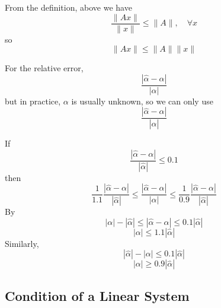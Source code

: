 From the definition, above we have \[
    \frac{\|Ax\|}{\|x\|} \leq \|A\|,\quad \forall x
\]
so \[
    \|Ax\| \leq \|A\| \|x\|
\]

\begin{note}

    For the relative error, \[
        \frac{|\hat{\alpha} - \alpha|}{|\alpha|}
    \]
    but in practice, $\alpha$ is usually unknown, so we can only use \[
        \frac{|\hat{\alpha} - \alpha|}{|\hat{\alpha}|}
    \]
    
    If \[
        \frac{|\hat{\alpha} - \alpha|}{|\hat{\alpha}|} \leq 0.1
    \]
    then \[
        \frac{1}{1.1} \frac{|\hat{\alpha} - \alpha|}{|\hat{\alpha}|} \leq \frac{|\hat{\alpha} - \alpha|}{|\alpha|} \leq \frac{1}{0.9} \frac{|\hat{\alpha} - \alpha|}{|\hat{\alpha}|}
    \]
    By \[
        |\alpha| - |\hat{\alpha}| \leq |\hat{\alpha} - \alpha| \leq 0.1 |\hat{\alpha}|
    \]
    \[
        |\alpha| \leq 1.1 |\hat{\alpha}|
    \]
    Similarly, \[
        |\hat{\alpha}| - |\alpha| \leq 0.1 |\hat{\alpha}|
    \]
    \[
        |\alpha| \geq 0.9 |\hat{\alpha}|
    \]
\end{note}

\subsection{Condition of a Linear System}

